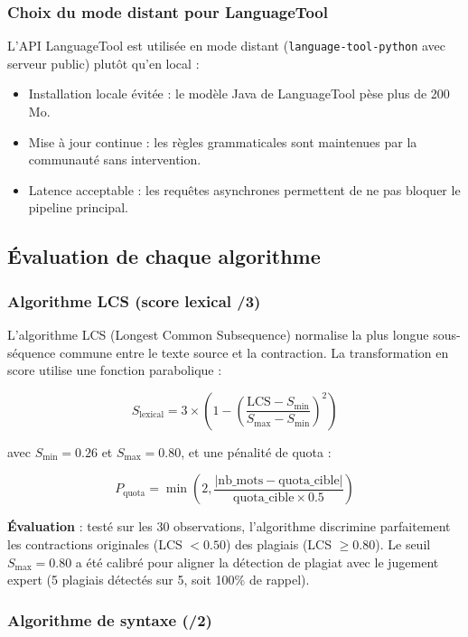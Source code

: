 \subsubsection{Choix du mode distant pour LanguageTool}

L'API LanguageTool est utilisée en mode distant (\texttt{language-tool-python} avec serveur public) plutôt qu'en local :

\begin{itemize}
    \item Installation locale évitée : le modèle Java de LanguageTool pèse plus de 200 Mo.
    \item Mise à jour continue : les règles grammaticales sont maintenues par la communauté sans intervention.
    \item Latence acceptable : les requêtes asynchrones permettent de ne pas bloquer le pipeline principal.
\end{itemize}

\subsection{Évaluation de chaque algorithme}

\subsubsection{Algorithme LCS (score lexical /3)}

L'algorithme LCS (Longest Common Subsequence) normalise la plus longue sous-séquence commune entre le texte source et la contraction. La transformation en score utilise une fonction parabolique :

\[
S_{\text{lexical}} = 3 \times \left(1 - \left(\frac{\text{LCS} - S_{\min}}{S_{\max} - S_{\min}}\right)^2\right)
\]

avec \(S_{\min}=0.26\) et \(S_{\max}=0.80\), et une pénalité de quota :

\[
P_{\text{quota}} = \min\left(2, \frac{|\text{nb\_mots} - \text{quota\_cible}|}{\text{quota\_cible} \times 0.5}\right)
\]

\textbf{Évaluation} : testé sur les 30 observations, l'algorithme discrimine parfaitement les contractions originales (LCS \(< 0.50\)) des plagiais (LCS \(\geq 0.80\)). Le seuil \(S_{\max}=0.80\) a été calibré pour aligner la détection de plagiat avec le jugement expert (5 plagiais détectés sur 5, soit 100\% de rappel).

\subsubsection{Algorithme de syntaxe (/2)}

